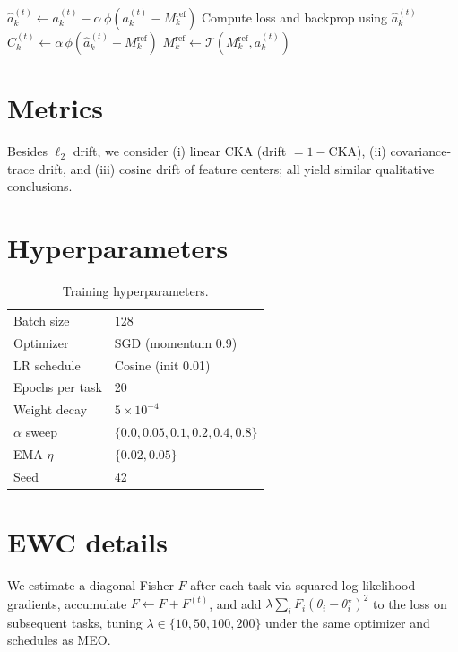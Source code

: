 \documentclass[11pt]{article}
\begin{document}
\begin{algorithm}[h]
\caption{Closed-loop MEO (per minibatch, layer $k$)}
\begin{algorithmic}[1]
\State $\hat a_k^{(t)} \gets a_k^{(t)} - \alpha\,\phi\!\left(a_k^{(t)}-M_k^{\text{ref}}\right)$
\State Compute loss and backprop using $\hat a_k^{(t)}$
\State $C_k^{(t)} \gets \alpha\,\phi\!\left(\hat a_k^{(t)}-M_k^{\text{ref}}\right)$ 
\State $M_k^{\text{ref}} \gets \mathcal{T}(M_k^{\text{ref}}, a_k^{(t)})$
\end{algorithmic}
\end{algorithm}

\section{Metrics}
Besides $\ell_2$ drift, we consider (i) linear CKA (drift $=1-\mathrm{CKA}$), (ii) covariance-trace drift, and (iii) cosine drift of feature centers; all yield similar qualitative conclusions.

\section{Hyperparameters}
\begin{table}[h]\centering
\caption{Training hyperparameters.}
\begin{tabular}{ll}\toprule
Batch size & 128\\
Optimizer & SGD (momentum 0.9)\\
LR schedule & Cosine (init 0.01)\\
Epochs per task & 20\\
Weight decay & $5\times 10^{-4}$\\
$\alpha$ sweep & $\{0.0,0.05,0.1,0.2,0.4,0.8\}$\\
EMA $\eta$ & $\{0.02,0.05\}$\\
Seed & 42\\\bottomrule
\end{tabular}\end{table}

\section{EWC details}
We estimate a diagonal Fisher $F$ after each task via squared log-likelihood gradients, accumulate $F\!\leftarrow\!F+F^{(t)}$, and add $\lambda\sum_i F_i(\theta_i-\theta_i^\star)^2$ to the loss on subsequent tasks, tuning $\lambda\in\{10,50,100,200\}$ under the same optimizer and schedules as MEO.
\end{document}
